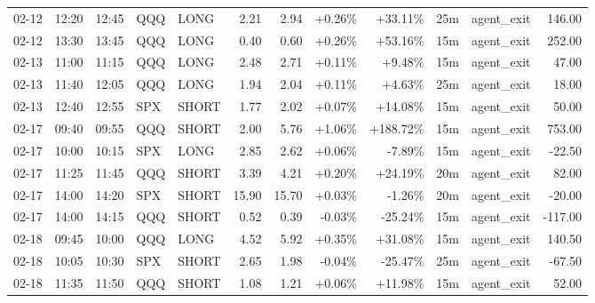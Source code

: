 \documentclass[11pt,a4paper]{article}
\begin{document}
\begin{center}
\begin{longtable}{>{\color{txtmain}}l l l l l r r r r r >{\color{txtmain}}l r}
02-12 & 12:20 & 12:45 & QQQ & LONG & 2.21 & 2.94 & \textcolor{wingreen}{+0.26\%} & \textcolor{wingreen}{+33.11\%} & 25m & agent\_exit & \textcolor{wingreen}{146.00} \\
02-12 & 13:30 & 13:45 & QQQ & LONG & 0.40 & 0.60 & \textcolor{wingreen}{+0.26\%} & \textcolor{wingreen}{+53.16\%} & 15m & agent\_exit & \textcolor{wingreen}{252.00} \\
02-13 & 11:00 & 11:15 & QQQ & LONG & 2.48 & 2.71 & \textcolor{wingreen}{+0.11\%} & \textcolor{wingreen}{+9.48\%} & 15m & agent\_exit & \textcolor{wingreen}{47.00} \\
02-13 & 11:40 & 12:05 & QQQ & LONG & 1.94 & 2.04 & \textcolor{wingreen}{+0.11\%} & \textcolor{wingreen}{+4.63\%} & 25m & agent\_exit & \textcolor{wingreen}{18.00} \\
02-13 & 12:40 & 12:55 & SPX & SHORT & 1.77 & 2.02 & \textcolor{wingreen}{+0.07\%} & \textcolor{wingreen}{+14.08\%} & 15m & agent\_exit & \textcolor{wingreen}{50.00} \\
02-17 & 09:40 & 09:55 & QQQ & SHORT & 2.00 & 5.76 & \textcolor{wingreen}{+1.06\%} & \textcolor{wingreen}{+188.72\%} & 15m & agent\_exit & \textcolor{wingreen}{753.00} \\
02-17 & 10:00 & 10:15 & SPX & LONG & 2.85 & 2.62 & \textcolor{wingreen}{+0.06\%} & \textcolor{lossred}{-7.89\%} & 15m & agent\_exit & \textcolor{lossred}{-22.50} \\
02-17 & 11:25 & 11:45 & QQQ & SHORT & 3.39 & 4.21 & \textcolor{wingreen}{+0.20\%} & \textcolor{wingreen}{+24.19\%} & 20m & agent\_exit & \textcolor{wingreen}{82.00} \\
02-17 & 14:00 & 14:20 & SPX & SHORT & 15.90 & 15.70 & \textcolor{wingreen}{+0.03\%} & \textcolor{lossred}{-1.26\%} & 20m & agent\_exit & \textcolor{lossred}{-20.00} \\
02-17 & 14:00 & 14:15 & QQQ & SHORT & 0.52 & 0.39 & \textcolor{lossred}{-0.03\%} & \textcolor{lossred}{-25.24\%} & 15m & agent\_exit & \textcolor{lossred}{-117.00} \\
02-18 & 09:45 & 10:00 & QQQ & LONG & 4.52 & 5.92 & \textcolor{wingreen}{+0.35\%} & \textcolor{wingreen}{+31.08\%} & 15m & agent\_exit & \textcolor{wingreen}{140.50} \\
02-18 & 10:05 & 10:30 & SPX & SHORT & 2.65 & 1.98 & \textcolor{lossred}{-0.04\%} & \textcolor{lossred}{-25.47\%} & 25m & agent\_exit & \textcolor{lossred}{-67.50} \\
02-18 & 11:35 & 11:50 & QQQ & SHORT & 1.08 & 1.21 & \textcolor{wingreen}{+0.06\%} & \textcolor{wingreen}{+11.98\%} & 15m & agent\_exit & \textcolor{wingreen}{52.00} \\

\end{longtable}
\end{center}
\end{document}
